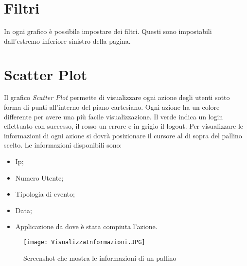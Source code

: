\section{Filtri}
In ogni grafico è possibile impostare dei filtri. Questi sono impostabili dall'estremo inferiore sinistro della pagina.

\section{Scatter Plot}
Il grafico \textit{Scatter Plot} permette di visualizzare ogni azione degli utenti sotto forma di punti all'interno del piano cartesiano.
Ogni azione ha un colore differente per avere una più facile visualizzazione.
Il verde indica un login effettuato con successo, il rosso un errore e in grigio il logout.
Per visualizzare le informazioni di ogni azione si dovrà posizionare il cursore al di sopra del pallino scelto. Le informazioni disponibili sono:
\begin{itemize}
  \item Ip;
  \item Numero Utente;
  \item Tipologia di evento;
  \item Data;
  \item Applicazione da dove è stata compiuta l'azione.
\end{itemize}

\begin{figure}[H]
    \texttt{[image: VisualizzaInformazioni.JPG]}
    \caption{Screenshot che mostra le informazioni di un pallino}
\end{figure}
